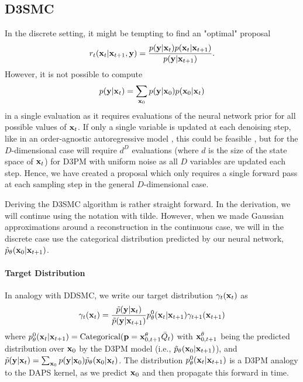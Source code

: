 \subsection{D3SMC}
In the discrete setting, it might be tempting to find an "optimal" proposal 
\begin{align}
    r_t(\mathbf{x}_{t}|\mathbf{x}_{t+1}, \mathbf{y}) =  \frac{p(\mathbf{y}|\mathbf{x}_{t})p(\mathbf{x}_{t}|\mathbf{x}_{t+1})}{p(\mathbf{y}|\mathbf{x}_{t+1})}.
\end{align} 
However, it is not possible to compute 
\begin{align}
    p(\mathbf{y}|\mathbf{x}_{t}) = \sum_{\mathbf{x}_0}p(\mathbf{y}|\mathbf{x}_0)p(\mathbf{x}_0|\mathbf{x}_{t})
\end{align}
in a single evaluation as it requires evaluations of the neural network prior for all possible values of $\mathbf{x}_{t}$. If only a single variable is updated at each denoising step, like in an order-agnostic autoregressive model \citep{uria_deep_2014}, this could be feasible \cite{ekstrom_kelvinius_discriminator_2024}, but for the $D$-dimensional case will require $d^D$ evaluations (where $d$ is the size of the state space of $\mathbf{x}_{t}$) for D3PM with uniform noise as all $D$ variables are updated each step. Hence, we have created a proposal which only requires a single forward pass at each sampling step in the general $D$-dimensional case. 

Deriving the D3SMC algorithm is rather straight forward. In the derivation, we will continue using the notation with tilde. However, when we made Gaussian approximations around a reconstruction in the continuous case, we will in the discrete case use the categorical distribution predicted by our neural network, $\tilde p_\theta(\mathbf{x}_0|\mathbf{x}_{t+1})$. 

\paragraph{Target Distribution}
In analogy with DDSMC, we write our target distribution $\gamma_t(\mathbf{x}_{t})$ as
\begin{align}
    \gamma_t(\mathbf{x}_{t}) 
    = \frac{\tilde p(\mathbf{y}|\mathbf{x}_{t})}{\tilde p(\mathbf{y}|\mathbf{x}_{t+1})}
    p^0_\theta(\mathbf{x}_{t}|\mathbf{x}_{t+1})\gamma_{t+1}(\mathbf{x}_{t+1}) 
\end{align}
where $p_\theta^0(\mathbf{x}_{t}|\mathbf{x}_{t+1}) = \text{Categorical}({\mathbf{p}} = \mathbf{x}^{\theta}_{0, t+1}\bar Q_t)$ with $\mathbf{x}^{\theta}_{0, t+1}$ being the predicted distribution over $\mathbf{x}_0$ by the D3PM model (i.e., $\tilde p_\theta(\mathbf{x}_0|\mathbf{x}_{t+1})$), and $\tilde p(\mathbf{y}|\mathbf{x}_{t}) = \sum_{\mathbf{x}_0}p(\mathbf{y}|\mathbf{x}_0)\tilde p_\theta(\mathbf{x}_0|\mathbf{x}_{t})$. The distribution $p_\theta^0(\mathbf{x}_{t}|\mathbf{x}_{t+1})$ is a D3PM analogy to the DAPS kernel, as we predict $\mathbf{x}_0$ and then propagate this forward in time.

